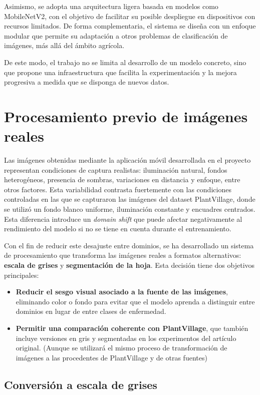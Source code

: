 \documentclass[12pt,a4paper]{article}
\begin{document}
Asimismo, se adopta una arquitectura ligera basada en modelos como MobileNetV2, con el objetivo de facilitar su posible despliegue en dispositivos con recursos limitados. De forma complementaria, el sistema se diseña con un enfoque modular que permite su adaptación a otros problemas de clasificación de imágenes, más allá del ámbito agrícola.

De este modo, el trabajo no se limita al desarrollo de un modelo concreto, sino que propone una infraestructura que facilita la experimentación y la mejora progresiva a medida que se disponga de nuevos datos.

\section{Procesamiento previo de imágenes reales}
\label{sec:preprocesado}

Las imágenes obtenidas mediante la aplicación móvil desarrollada en el proyecto representan condiciones de captura realistas: iluminación natural, fondos heterogéneos, presencia de sombras, variaciones en distancia y enfoque, entre otros factores. Esta variabilidad contrasta fuertemente con las condiciones controladas en las que se capturaron las imágenes del dataset PlantVillage, donde se utilizó un fondo blanco uniforme, iluminación constante y encuadres centrados. Esta diferencia introduce un \textit{domain shift} que puede afectar negativamente al rendimiento del modelo si no se tiene en cuenta durante el entrenamiento.

Con el fin de reducir este desajuste entre dominios, se ha desarrollado un sistema de procesamiento que transforma las imágenes reales a formatos alternativos: \textbf{escala de grises} y \textbf{segmentación de la hoja}. Esta decisión tiene dos objetivos principales:
\begin{itemize}
    \item \textbf{Reducir el sesgo visual asociado a la fuente de las imágenes}, eliminando color o fondo para evitar que el modelo aprenda a distinguir entre dominios en lugar de entre clases de enfermedad.
    \item \textbf{Permitir una comparación coherente con PlantVillage}, que también incluye versiones en gris y segmentadas en los experimentos del artículo original. (Aunque se utilizará el mismo proceso de transformación de imágenes a las procedentes de PlantVillage y de otras fuentes)
\end{itemize}

\subsection{Conversión a escala de grises}
\end{document}
